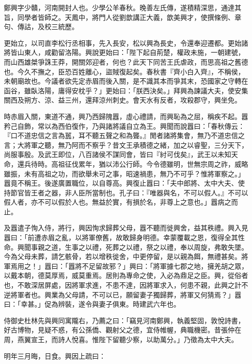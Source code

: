 
\begin{pinyinscope}
鄭興字少贛，河南開封人也。少學公羊春秋。晚善左氏傳，遂積精深思，通達其旨，同學者皆師之。天鳳中，將門人從劉歆講正大義，歆美興才，使撰條例、章句、傳詁，及校三統歷。

更始立，以司直李松行丞相事，先入長安，松以興為長史，令還奉迎遷都。更始諸將皆山東人，咸勸留洛陽。興說更始曰：「陛下起自荊楚，權政未施，一朝建號，而山西雄桀爭誅王莽，開關郊迎者，何也？此天下同苦王氏虐政，而思高祖之舊德也。今久不撫之，臣恐百姓離心，盜賊復起矣。春秋書『齊小白入齊』，不稱侯，未朝廟故也。今議者欲先定赤眉而後入關，是不識其本而爭其末，恐國家之守轉在函谷，雖臥洛陽，庸得安枕乎？」更始曰：「朕西決矣。」拜興為諫議大夫，使安集關西及朔方、涼、益三州，還拜涼州刺史。會天水有反者，攻殺郡守，興坐免。

時赤眉入關，東道不通，興乃西歸隗囂，虛心禮請，而興恥為之屈，稱疾不起。囂矜己自飾，常以為西伯復作，乃與諸將議自立為王。興聞而說囂曰：「春秋傳云：『口不道忠信之言為嚚，耳不聽五聲之和為聾。』閒者諸將集會，無乃不道忠信之言；大將軍之聽，無乃阿而不察乎？昔文王承積德之緒，加之以睿聖，三分天下，尚服事殷。及武王即位，八百諸侯不謀同會，皆曰『紂可伐矣』，武王以未知天命，還兵待時。高祖征伐累年，猶以沛公行師。今令德雖明，世無宗周之祚，威略雖振，未有高祖之功，而欲舉未可之事，昭速禍患，無乃不可乎？惟將軍察之。」囂竟不稱王。後遂廣置職位，以自尊高。興復止囂曰：「夫中郎將、太中大夫、使持節官皆王者之器，非人臣所當制也。孔子曰：『唯器與名，不可以假人。』不可以假人者，亦不可以假於人也。無益於實，有損於名，非尊上之意也。」囂病之而止。

及囂遣子恂入侍，將行，興因恂求歸葬父母，囂不聽而徙興舍，益其秩禮。興入見囂曰：「前遭赤眉之亂，以將軍僚舊，故敢歸身明德。幸蒙覆載之恩，復得全其性命。興聞事親之道，生事之以禮，死葬之以禮，祭之以禮，奉以周旋，弗敢失墜。今為父母未葬，請乞骸骨，若以增秩徙舍，中更停留，是以親為餌，無禮甚矣。將軍焉用之！」囂曰：「囂將不足留故邪？」興曰：「將軍據七郡之地，擁羌胡之眾，以戴本朝，德莫厚焉，威莫重焉。居則為專命之使，入必為鼎足之臣。興，從俗者也，不敢深居屏處，因將軍求進，不患不達，因將軍求入，何患不親，此興之計不逆將軍者也。興業為父母請，不可以已，願留妻子獨歸葬，將軍又何猜焉？」囂曰：「幸甚。」促為辨裝，遂令與妻子俱東。時建武六年也。

侍御史杜林先與興同寓隴右，乃薦之曰：「竊見河南鄭興，執義堅固，敦悅詩書，好古博物，見疑不惑，有公孫僑、觀射父之德，宜侍帷幄，典職機密。昔張仲在周，燕翼宣王，而詩人悅喜。惟陛下留聽少察，以助萬分。」乃徵為太中大夫。

明年三月晦，日食。興因上疏曰：


\end{pinyinscope}
